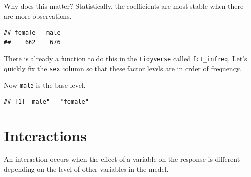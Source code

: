 \documentclass[openany]{book}
\newenvironment{Shaded}{\begin{snugshade}}{\end{snugshade}}
\newcommand{\DataTypeTok}[1]{\textcolor[rgb]{0.13,0.29,0.53}{#1}}
\newcommand{\KeywordTok}[1]{\textcolor[rgb]{0.13,0.29,0.53}{\textbf{#1}}}
\newcommand{\NormalTok}[1]{#1}
\newcommand{\OperatorTok}[1]{\textcolor[rgb]{0.81,0.36,0.00}{\textbf{#1}}}
\newcommand{\StringTok}[1]{\textcolor[rgb]{0.31,0.60,0.02}{#1}}
\begin{document}
Why does this matter? Statistically, the coefficients are most stable when there are more observations.

\begin{Shaded}
\end{Shaded}

\begin{verbatim}
## female   male 
##    662    676
\end{verbatim}

There is already a function to do this in the \texttt{tidyverse} called \texttt{fct\_infreq}. Let's quickly fix the \texttt{sex} column so that these factor levels are in order of frequency.

\begin{Shaded}
\end{Shaded}

Now \texttt{male} is the base level.

\begin{Shaded}
\end{Shaded}

\begin{verbatim}
## [1] "male"   "female"
\end{verbatim}

\hypertarget{interactions}{%
\section{Interactions}\label{interactions}}

An interaction occurs when the effect of a variable on the response is different depending on the level of other variables in the model.
\end{document}
